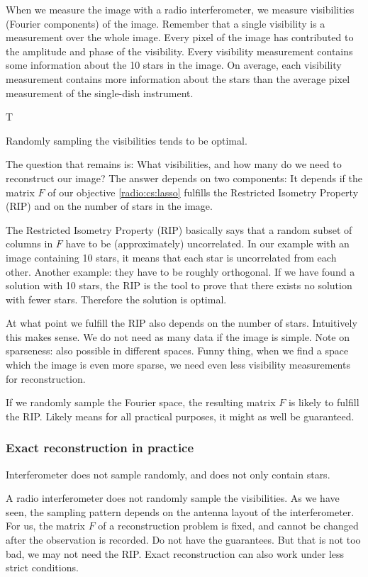 When we measure the image with a radio interferometer, we measure visibilities (Fourier components) of the image. Remember that a single visibility is a measurement over the whole image. Every pixel of the image has contributed to the amplitude and phase of the visibility. Every visibility measurement contains some information about the 10 stars in the image. On average, each visibility measurement contains more information about the stars than the average pixel measurement of the single-dish instrument.

T

Randomly sampling the visibilities tends to be optimal.

The question that remains is: What visibilities, and how many do we need to reconstruct our image? The answer depends on two components: It depends if the matrix $F$ of our objective \eqref{radio:cs:lasso} fulfills the Restricted Isometry Property (RIP) and on the number of stars in the image.

The Restricted Isometry Property (RIP)\cite{candes2006robust,donoho2006compressed} basically says that a random subset of columns in $F$ have to be (approximately) uncorrelated. 
In our example with an image containing 10 stars, it means that each star is uncorrelated from each other.
Another example: they have to be roughly orthogonal.
If we have found a solution with 10 stars, the RIP is the tool to prove that there exists no solution with fewer stars. Therefore the solution is optimal.

At what point we fulfill the RIP also depends on the number of stars. Intuitively this makes sense. We do not need as many data if the image is simple.
Note on sparseness: also possible in different spaces. Funny thing, when we find a space which the image is even more sparse, we need even less visibility measurements for reconstruction.

If we randomly sample the Fourier space, the resulting matrix $F$ is likely to fulfill the RIP\cite{haviv2017restricted}. Likely means for all practical purposes, it might as well be guaranteed.


\subsubsection{Exact reconstruction in practice}
Interferometer does not sample randomly, and does not only contain stars.

A radio interferometer does not randomly sample the visibilities. As we have seen, the sampling pattern depends on the antenna layout of the interferometer. For us, the matrix $F$ of a reconstruction problem is fixed, and cannot be changed after the observation is recorded.
Do not have the guarantees. But that is not too bad, we may not need the RIP. 
 Exact reconstruction can also work under less strict conditions\cite{candes2011probabilistic}.
 
